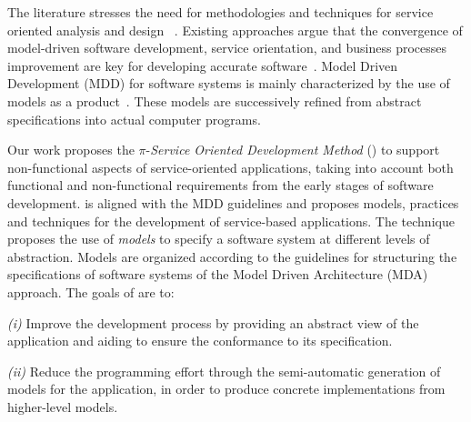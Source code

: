 




The literature stresses the need for methodologies and techniques for service oriented analysis and design 
~\cite{Papazoglou2007}. 
Existing approaches argue that the convergence of model-driven software development, service orientation,   and  business processes improvement are key for developing accurate  software~\cite{watson}. 
Model Driven Development (MDD)  for software systems is mainly characterized by the use of models as a product~\cite{Selic03}.
These models are successively refined from abstract specifications into actual computer programs.

Our work proposes  the $\pi$-\textit{Service Oriented Development Method} (\pisodm)
to support non-functional aspects of service-oriented applications, taking into account both functional and non-functional requirements from the early stages of software development.
\pisodm is aligned with the MDD guidelines and proposes models, practices and techniques for the development of service-based applications.  The technique proposes  the use of \textit{models} to specify a software system at different levels of abstraction. 
Models are organized according to the guidelines for structuring the specifications of software systems of the Model Driven Architecture (MDA)~\cite{miller} approach. 
The goals of  \pisodm are to:
\begin{trivlist}
\item \textit{(i)} Improve the development process by providing an abstract view of the application and aiding to ensure the conformance to its specification.
\item \textit{(ii)} Reduce the programming effort through the semi-automatic generation of  models for the application, in order to produce concrete implementations from higher-level models.
\end{trivlist}


